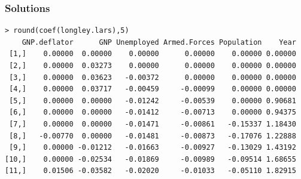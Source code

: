 \documentclass[]{beamer}
\begin{document}
\begin{frame}[fragile]
  \frametitle{Solutions}
{\fontsize{9pt}{10pt} \selectfont
\begin{verbatim}
> round(coef(longley.lars),5)
    GNP.deflator      GNP Unemployed Armed.Forces Population    Year
 [1,]    0.00000  0.00000    0.00000      0.00000    0.00000 0.00000
 [2,]    0.00000  0.03273    0.00000      0.00000    0.00000 0.00000
 [3,]    0.00000  0.03623   -0.00372      0.00000    0.00000 0.00000
 [4,]    0.00000  0.03717   -0.00459     -0.00099    0.00000 0.00000
 [5,]    0.00000  0.00000   -0.01242     -0.00539    0.00000 0.90681
 [6,]    0.00000  0.00000   -0.01412     -0.00713    0.00000 0.94375
 [7,]    0.00000  0.00000   -0.01471     -0.00861   -0.15337 1.18430
 [8,]   -0.00770  0.00000   -0.01481     -0.00873   -0.17076 1.22888
 [9,]    0.00000 -0.01212   -0.01663     -0.00927   -0.13029 1.43192
[10,]    0.00000 -0.02534   -0.01869     -0.00989   -0.09514 1.68655
[11,]    0.01506 -0.03582   -0.02020     -0.01033   -0.05110 1.82915
\end{verbatim}
}
\end{frame}
\end{document}
